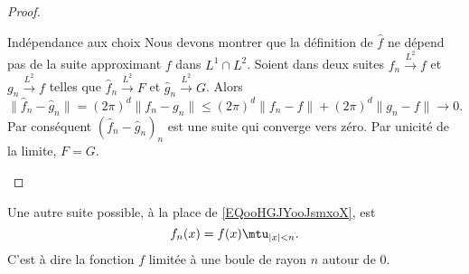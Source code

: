 \begin{proof}
\begin{subproof}
        \item[Indépendance aux choix]
            Nous devons montrer que la définition de \( \hat f\) ne dépend pas de la suite approximant \( f\) dans \( L^1\cap L^2\). Soient dans deux suites \( f_n\stackrel{L^2}{\longrightarrow}f\) et \( g_n\stackrel{L^2}{\longrightarrow}f\) telles que \( \hat f_n\stackrel{L^2}{\longrightarrow}F\) et \( \hat g_n\stackrel{L^2}{\longrightarrow}G\). Alors
            \begin{equation}
                \| \hat f_n-\hat g_n \|=(2\pi)^d\| f_n-g_n \|\leq (2\pi)^d\| f_n-f \|+(2\pi)^d\| g_n-f \|\to 0.
            \end{equation}
            Par conséquent \( (\hat f_n-\hat g_n)_n\) est une suite qui converge vers zéro. Par unicité de la limite, \( F=G\).
    \end{subproof}
\end{proof}

\begin{remark}
    Une autre suite possible, à la place de \eqref{EQooHGJYooJsmxoX}, est 
    \begin{equation}
        f_n(x)=f(x)\mtu_{| x |<n}.
    \end{equation}
    C'est à dire la fonction \( f\) limitée à une boule de rayon \( n\) autour de \( 0\).
\end{remark}
